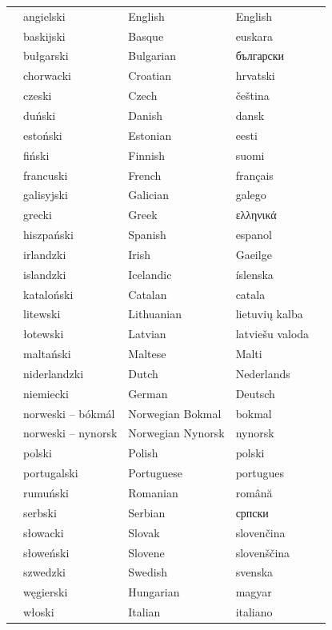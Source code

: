 \vspace*{-5mm}
\centering
  \setlength{\tabcolsep}{2em}
  \begin{tabularx}{\textwidth}{lllll} \toprule\addlinespace
&angielski& English& English& \\
&baskijski& Basque& euskara& \\
&bułgarski& Bulgarian& български& \\
&chorwacki& Croatian& hrvatski& \\
&czeski& Czech& čeština& \\
&duński& Danish& dansk& \\
&estoński& Estonian& eesti& \\
&fiński& Finnish& suomi& \\
&francuski& French& français& \\
&galisyjski& Galician& galego& \\
&grecki& Greek & ελληνικά \\
&hiszpański& Spanish & espanol& \\
&irlandzki& Irish& Gaeilge& \\
&islandzki& Icelandic& íslenska& \\
&kataloński& Catalan& catala& \\
&litewski& Lithuanian& lietuvi\k{u} kalba& \\
&łotewski& Latvian& latviešu valoda& \\
&maltański& Maltese& Malti& \\
&niderlandzki& Dutch& Nederlands& \\
&niemiecki& German& Deutsch& \\
&norweski – bókmál& Norwegian Bokmal& bokmal& \\
&norweski – nynorsk& Norwegian Nynorsk& nynorsk& \\
&polski& Polish& polski& \\
&portugalski& Portuguese& portugues& \\
&rumuński& Romanian& română& \\
&serbski& Serbian& српски& \\
&słowacki& Slovak& slovenčina& \\
&słoweński& Slovene& slovenščina& \\
&szwedzki& Swedish& svenska& \\
&węgierski& Hungarian& magyar& \\
&włoski& Italian& italiano& \\
\bottomrule
\end{tabularx}

 

